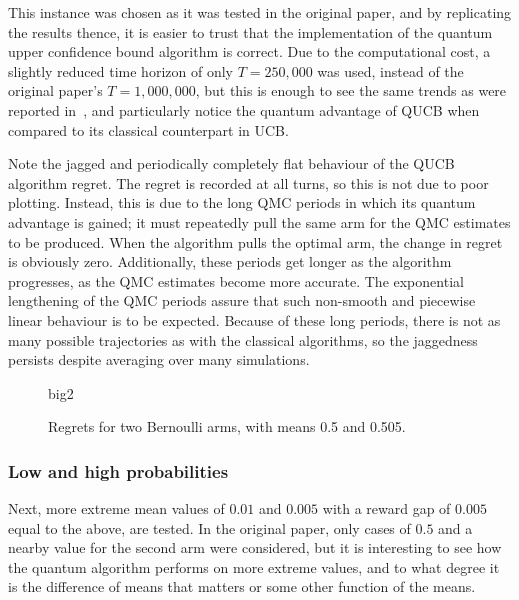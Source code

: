 This instance was chosen as it was tested in the original paper, and by replicating the results thence, it is easier to trust that the implementation of the quantum upper confidence bound algorithm is correct.
Due to the computational cost, a slightly reduced time horizon of only $T=250,000$ was used, instead of the original paper's $T=1,000,000$, but this is enough to see the same trends as were reported in~\autocite{wan2022}, and particularly notice the quantum advantage of QUCB when compared to its classical counterpart in UCB.

Note the jagged and periodically completely flat behaviour of the QUCB algorithm regret.
The regret is recorded at all turns, so this is not due to poor plotting.
Instead, this is due to the long QMC periods in which its quantum advantage is gained; it must repeatedly pull the same arm for the QMC estimates to be produced.
When the algorithm pulls the optimal arm, the change in regret is obviously zero.
Additionally, these periods get longer as the algorithm progresses, as the QMC estimates become more accurate.
The exponential lengthening of the QMC periods assure that such non-smooth and piecewise linear behaviour is to be expected.
Because of these long periods, there is not as many possible trajectories as with the classical algorithms, so the jaggedness persists despite averaging over many simulations.

\begin{figure}[p]
    \centering
    \newcommand{\myoptions}{
        width=10cm,
        height=8cm,
        xlabel={Kiloturn},
        ylabel={Regret},
        legend entries={UCB, QUCB, Thompson},
        legend pos=north west,
        legend cell align=left,
        mystyle,
    }
    {big2}
    \caption[
        Regrets for two Bernoulli arms, with means 0.5 and 0.505.
    ]{
        Regrets for two Bernoulli arms, with means 0.5 and 0.505.
    }
    \label{fig:big2}
\end{figure}


\clearpage

\subsubsection{Low and high probabilities}
Next, more extreme mean values of $0.01$ and $0.005$ with a reward gap of $0.005$ equal to the above, are tested.
In the original paper, only cases of $0.5$ and a nearby value for the second arm were considered, but it is interesting to see how the quantum algorithm performs on more extreme values, and to what degree it is the difference of means that matters or some other function of the means.

